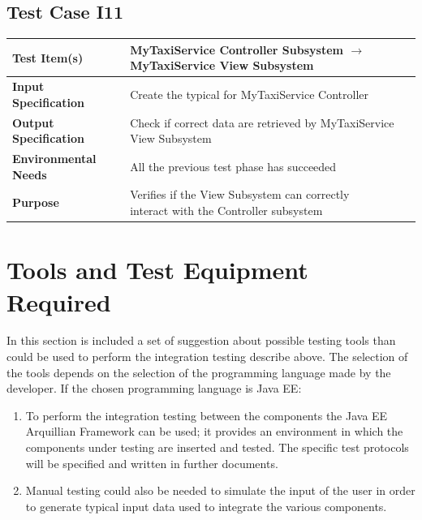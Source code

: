 \documentclass[11pt,titlepage]{article} %
\begin{document}
  \subsection{Test Case I11}
  \begin{table}[ht!]
    \begin{tabular*}{16cm}{ll}
	\hline
	\textbf{Test Item(s)} & MyTaxiService Controller Subsystem $ \longrightarrow $ MyTaxiService View Subsystem \\
	\hline
	\textbf{Input Specification} & Create the typical for MyTaxiService Controller \\
	\hline
	\textbf{Output Specification} & Check if correct data are retrieved by MyTaxiService View Subsystem \\
	\hline
	\textbf{Environmental Needs} & All the previous test phase has succeeded\\
	\hline
	\textbf{Purpose} & \pbox{20cm}{Verifies if the View Subsystem can correctly \\ interact with the Controller subsystem} \\
	\hline
    \end{tabular*}
  \end{table}

\newpage

\section{Tools and Test Equipment Required}
  In this section is included a set of suggestion about possible testing tools than could be used to perform the integration 
  testing describe above.\newline
  The selection of the tools depends on the selection of the programming language made by the developer.\newline
  If the chosen programming language is Java EE:
  \begin{enumerate}
   \item To perform the integration testing between the components the Java EE Arquillian Framework can be used;
	 it provides an environment in which the components under testing are inserted and tested. The specific 
	 test protocols will be specified and written in further documents.
   \item Manual testing could also be needed to simulate the input of the user in order to generate typical
	 input data used to integrate the various components.
  \end{enumerate}
\end{document}

